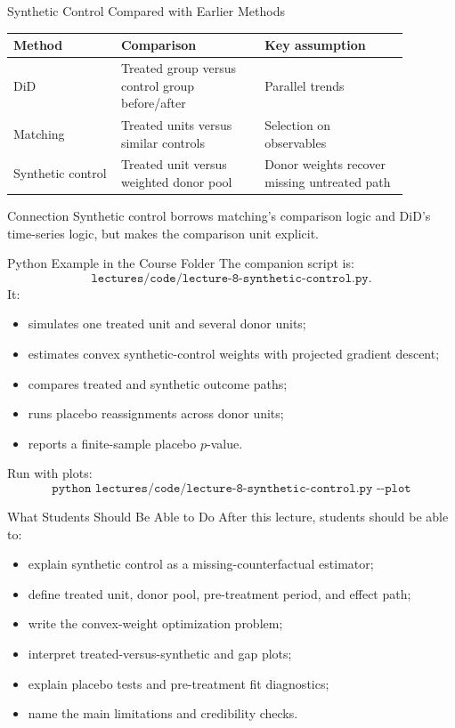 \documentclass[11pt,aspectratio=169]{beamer}
\begin{document}
\begin{frame}{Synthetic Control Compared with Earlier Methods}
  \begin{tabular}{p{0.24\linewidth}p{0.32\linewidth}p{0.32\linewidth}}
    \toprule
    \textbf{Method} & \textbf{Comparison} & \textbf{Key assumption}\\
    \midrule
    DiD & Treated group versus control group before/after & Parallel trends\\
    Matching & Treated units versus similar controls & Selection on observables\\
    Synthetic control & Treated unit versus weighted donor pool & Donor weights recover missing untreated path\\
    \bottomrule
  \end{tabular}
  \vspace{0.6em}

  \begin{block}{Connection}
    Synthetic control borrows matching's comparison logic and DiD's time-series logic, but makes the comparison unit explicit.
  \end{block}
\end{frame}

\begin{frame}{Python Example in the Course Folder}
  The companion script is:
  \[
    \texttt{lectures/code/lecture-8-synthetic-control.py}.
  \]
  It:
  \begin{itemize}
    \item simulates one treated unit and several donor units;
    \item estimates convex synthetic-control weights with projected gradient descent;
    \item compares treated and synthetic outcome paths;
    \item runs placebo reassignments across donor units;
    \item reports a finite-sample placebo \(p\)-value.
  \end{itemize}
  Run with plots:
  \[
    \texttt{python lectures/code/lecture-8-synthetic-control.py -{}-plot}
  \]
\end{frame}

\begin{frame}{What Students Should Be Able to Do}
  After this lecture, students should be able to:
  \begin{itemize}
    \item explain synthetic control as a missing-counterfactual estimator;
    \item define treated unit, donor pool, pre-treatment period, and effect path;
    \item write the convex-weight optimization problem;
    \item interpret treated-versus-synthetic and gap plots;
    \item explain placebo tests and pre-treatment fit diagnostics;
    \item name the main limitations and credibility checks.
  \end{itemize}
\end{frame}
\end{document}
